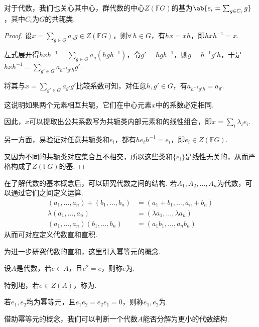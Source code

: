 \begin{instance}
    对于代数，我们也关心其中心，群代数的中心$Z(\mathbb{F}G)$的基为$\ab\{e_i = \sum_{g \in C_i} g\}$，其中$C_i$为$G$的共轭类.\par
    \begin{proof}
        设$x = \sum_{g \in G} a_g g \in Z(\mathbb{F}G)$，则$\forall\,h \in G$，有$hx = xh$，即$hxh^{-1} = x$.\par
    左式展开得$hxh^{-1} = \sum_{g \in G} a_g (hgh^{-1})$，令$g' = hgh^{-1}$，则$g = h^{-1}g'h$，于是$hxh^{-1} = \sum_{g' \in G} a_{h^{-1}g'h} g'$.\par
    将其与$x = \sum_{g' \in G} a_{g'} g'$比较系数可知，对任意$h, g' \in G$，有$a_{h^{-1}g'h} = a_{g'}$.\par
    这说明如果两个元素相互共轭，它们在中心元素$x$中的系数必定相同.\par
    因此，$x$可以提取出公共系数写为共轭类内部元素和的线性组合，即$x = \sum_i \lambda_i e_i$.\par
    另一方面，易验证对任意共轭类和$e_i$，都有$he_i h^{-1} = e_i$，即$e_i \in Z(\mathbb{F}G)$.\par
    又因为不同的共轭类对应集合互不相交，所以这些类和$\{e_i\}$是线性无关的，从而严格构成了$Z(\mathbb{F}G)$的基.
    \end{proof}
\end{instance}在了解代数的基本概念后，可以研究代数之间的结构.
若$A_1, A_2, \dots, A_n$为代数，可以通过它们之间定义运算.
\begin{align*}
    (a_1, \dots, a_n) + (b_1, \dots, b_n) &= (a_1 + b_1, \dots, a_n + b_n) \\
    \lambda(a_1, \dots, a_n) &= (\lambda a_1, \dots, \lambda a_n) \\
    (a_1, \dots, a_n)(b_1, \dots, b_n) &= (a_1b_1, \dots, a_nb_n)
\end{align*}
从而可对应定义代数直和直积.

为进一步研究代数的直和，这里引入幂等元的概念.

\begin{definition}
    设$A$是代数，若$e \in A$，且$e^2 = e$，则称$e$为. \par
    特别地，若$e \in Z(A)$，称为.\par
    若$e_1, e_2$均为幂等元，且$e_1 e_2 = e_2 e_1 = 0$，则称$e_1, e_2$为.
\end{definition}

借助幂等元的概念，我们可以判断一个代数$A$能否分解为更小的代数结构.

